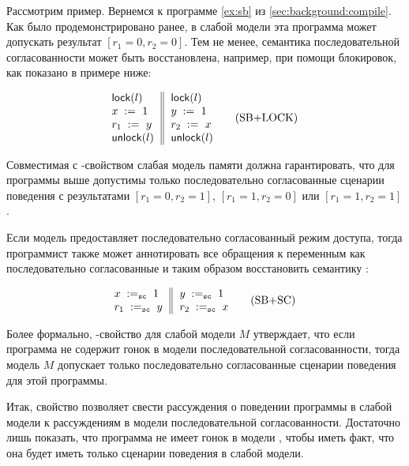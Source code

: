 Рассмотрим пример. 
Вернемся к программе \ref{ex:sb} из \cref{sec:background:compile}.
Как было продемонстрировано ранее, в слабой модели 
эта программа может допускать результат ${[r_1=0, r_2=0]}$.
Тем не менее, семантика последовательной согласованности
может быть восстановлена, например, при помощи блокировок, 
как показано в примере ниже:

\begin{equation*}
\inarrII{
   \lockInst{l}         \\
   \writeInst{}{x}{1}   \\
   \readInst{}{r_1}{y}  \\
   \unlockInst{l}       \\
}{
   \lockInst{l}         \\
   \writeInst{}{y}{1}   \\
   \readInst{}{r_2}{x}  \\
   \unlockInst{l}       \\
}
\tag{SB+LOCK}\label{ex:sb-lock}
\end{equation*}

Совместимая с \DRF-свойством слабая модель памяти должна гарантировать, 
что для программы выше допустимы только 
последовательно согласованные сценарии поведения с результатами
${[r_1=0, r_2=1]}$, ${[r_1=1,r_2=0]}$ или ${[r_1=1,r_2=1]}$.

Если модель предоставляет последовательно согласованный 
режим доступа, тогда программист также может 
аннотировать все обращения к переменным как последовательно согласованные
и таким образом восстановить семантику \SC:
 
\begin{equation*}
\inarrII{
   \writeInst{\sco}{x}{1}   \\
   \readInst{\sco}{r_1}{y}  \\
}{
   \writeInst{\sco}{y}{1}   \\
   \readInst{\sco}{r_2}{x}  \\
}
\tag{SB+SC}\label{ex:sb-sc}
\end{equation*}

Более формально, \DRF-свойство для слабой модели $M$
утверждает, что если программа не содержит гонок в модели 
последовательной согласованности, тогда модель $M$
допускает только последовательно согласованные 
сценарии поведения для этой программы.

Итак, свойство \DRF позволяет свести рассуждения о поведении программы 
в слабой модели к рассуждениям в модели последовательной согласованности.
Достаточно лишь показать, что программа не имеет гонок 
в модели \SC, чтобы иметь факт, что она будет иметь только \SC 
сценарии поведения в слабой модели. 

